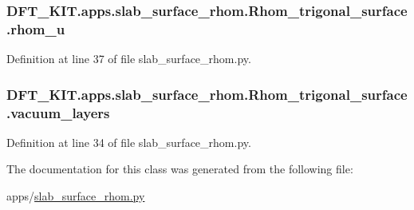 \hypertarget{class_d_f_t___k_i_t_1_1apps_1_1slab__surface__rhom_1_1_rhom__trigonal__surface_ace9262e8227a0f6d26b7c9f422bd78a7}{
\subsubsection[{rhom\+\_\+u}]{\setlength{\rightskip}{0pt plus 5cm}D\+F\+T\+\_\+\+K\+I\+T.\+apps.\+slab\+\_\+surface\+\_\+rhom.\+Rhom\+\_\+trigonal\+\_\+surface.\+rhom\+\_\+u}}\label{class_d_f_t___k_i_t_1_1apps_1_1slab__surface__rhom_1_1_rhom__trigonal__surface_ace9262e8227a0f6d26b7c9f422bd78a7}


Definition at line 37 of file slab\+\_\+surface\+\_\+rhom.\+py.

\hypertarget{class_d_f_t___k_i_t_1_1apps_1_1slab__surface__rhom_1_1_rhom__trigonal__surface_ab595b72d6f93bce6ce61d31610cc882e}{
\subsubsection[{vacuum\+\_\+layers}]{\setlength{\rightskip}{0pt plus 5cm}D\+F\+T\+\_\+\+K\+I\+T.\+apps.\+slab\+\_\+surface\+\_\+rhom.\+Rhom\+\_\+trigonal\+\_\+surface.\+vacuum\+\_\+layers}}\label{class_d_f_t___k_i_t_1_1apps_1_1slab__surface__rhom_1_1_rhom__trigonal__surface_ab595b72d6f93bce6ce61d31610cc882e}


Definition at line 34 of file slab\+\_\+surface\+\_\+rhom.\+py.



The documentation for this class was generated from the following file\+:\begin{DoxyCompactItemize}
\item 
apps/\hyperlink{slab__surface__rhom_8py}{slab\+\_\+surface\+\_\+rhom.\+py}\end{DoxyCompactItemize}
